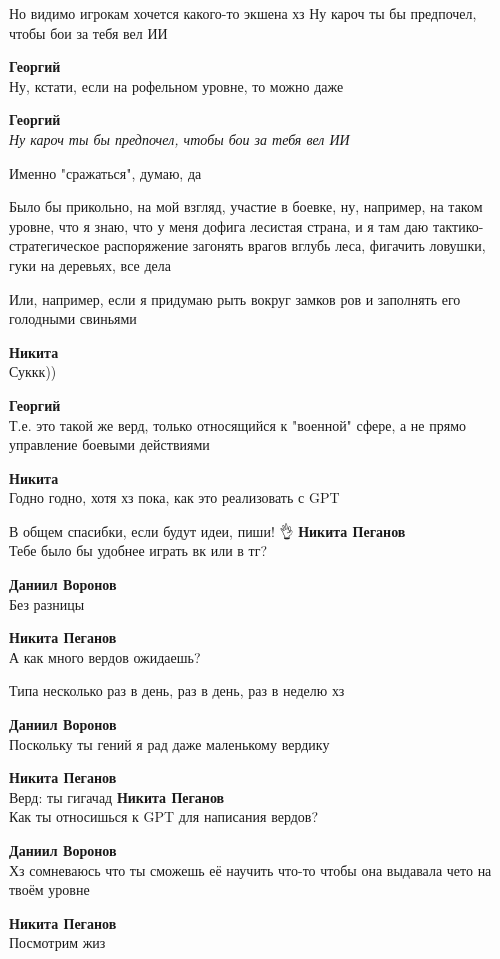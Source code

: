 \begin{tabbing}
Но видимо игрокам хочется какого-то экшена хз
Ну кароч ты бы предпочел, чтобы бои за тебя вел ИИ

\textbf{Георгий} \\
Ну, кстати, если на рофельном уровне, то можно даже

\textbf{Георгий} \\
\textit{Ну кароч ты бы предпочел, чтобы бои за тебя вел ИИ}

Именно "сражаться", думаю, да

Было бы прикольно, на мой взгляд, участие в боевке, ну, например, на таком уровне, что я знаю, что у меня дофига лесистая страна, и я там даю тактико-стратегическое распоряжение загонять врагов вглубь леса, фигачить ловушки, гуки на деревьях, все дела

Или, например, если я придумаю рыть вокруг замков ров и заполнять его голодными свиньями

\textbf{Никита} \\
Суккк))

\textbf{Георгий} \\
Т.е. это такой же верд, только относящийся к "военной" сфере, а не прямо управление боевыми действиями

\textbf{Никита} \\
Годно годно, хотя хз пока, как это реализовать с GPT

В общем спасибки, если будут идеи, пиши! 👌
\textbf{Никита Пеганов} \\
Тебе было бы удобнее играть вк или в тг?

\textbf{Даниил Воронов} \\
Без разницы

\textbf{Никита Пеганов} \\
А как много вердов ожидаешь?

Типа несколько раз в день, раз в день, раз в неделю хз

\textbf{Даниил Воронов} \\
Поскольку ты гений я рад даже маленькому вердику

\textbf{Никита Пеганов} \\
Верд: ты гигачад
\textbf{Никита Пеганов} \\
Как ты относишься к GPT для написания вердов?

\textbf{Даниил Воронов} \\
Хз сомневаюсь что ты сможешь её научить что-то чтобы она выдавала чето на твоём уровне

\textbf{Никита Пеганов} \\
Посмотрим жиз


\end{tabbing}
